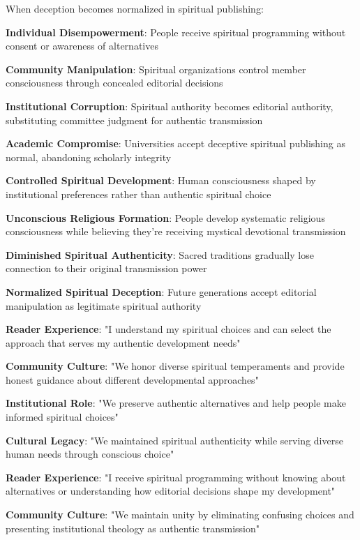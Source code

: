 \documentclass[12pt,twoside]{book}
\begin{document}
When deception becomes normalized in spiritual publishing:

\textbf{\textbf{Individual Disempowerment}}: People receive spiritual programming without consent or awareness of alternatives

\textbf{\textbf{Community Manipulation}}: Spiritual organizations control member consciousness through concealed editorial decisions

\textbf{\textbf{Institutional Corruption}}: Spiritual authority becomes editorial authority, substituting committee judgment for authentic transmission

\textbf{\textbf{Academic Compromise}}: Universities accept deceptive spiritual publishing as normal, abandoning scholarly integrity

\textbf{\textbf{Controlled Spiritual Development}}: Human consciousness shaped by institutional preferences rather than authentic spiritual choice

\textbf{\textbf{Unconscious Religious Formation}}: People develop systematic religious consciousness while believing they're receiving mystical devotional transmission

\textbf{\textbf{Diminished Spiritual Authenticity}}: Sacred traditions gradually lose connection to their original transmission power

\textbf{\textbf{Normalized Spiritual Deception}}: Future generations accept editorial manipulation as legitimate spiritual authority

\textbf{\textbf{Reader Experience}}: "I understand my spiritual choices and can select the approach that serves my authentic development needs"

\textbf{\textbf{Community Culture}}: "We honor diverse spiritual temperaments and provide honest guidance about different developmental approaches"

\textbf{\textbf{Institutional Role}}: "We preserve authentic alternatives and help people make informed spiritual choices"

\textbf{\textbf{Cultural Legacy}}: "We maintained spiritual authenticity while serving diverse human needs through conscious choice"

\textbf{\textbf{Reader Experience}}: "I receive spiritual programming without knowing about alternatives or understanding how editorial decisions shape my development"

\textbf{\textbf{Community Culture}}: "We maintain unity by eliminating confusing choices and presenting institutional theology as authentic transmission"
\end{document}
